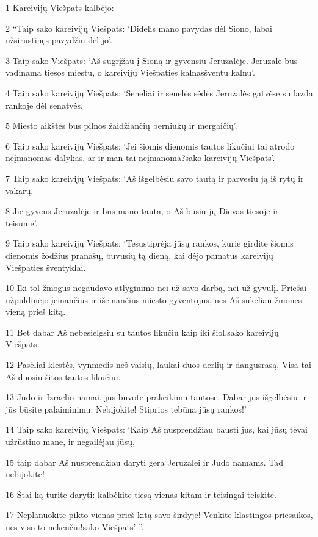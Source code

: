 \par 1 Kareivijų Viešpats kalbėjo: 
\par 2 “Taip sako kareivijų Viešpats: ‘Didelis mano pavydas dėl Siono, labai užsirūstinęs pavydžiu dėl jo’. 
\par 3 Taip sako Viešpats: ‘Aš sugrįžau į Sioną ir gyvensiu Jeruzalėje. Jeruzalė bus vadinama tiesos miestu, o kareivijų Viešpaties kalnas­šventu kalnu’. 
\par 4 Taip sako kareivijų Viešpats: ‘Seneliai ir senelės sėdės Jeruzalės gatvėse su lazda rankoje dėl senatvės. 
\par 5 Miesto aikštės bus pilnos žaidžiančių berniukų ir mergaičių’. 
\par 6 Taip sako kareivijų Viešpats: ‘Jei šiomis dienomis tautos likučiui tai atrodo neįmanomas dalykas, ar ir man tai neįmanoma?­sako kareivijų Viešpats’. 
\par 7 Taip sako kareivijų Viešpats: ‘Aš išgelbėsiu savo tautą ir parvesiu ją iš rytų ir vakarų. 
\par 8 Jie gyvens Jeruzalėje ir bus mano tauta, o Aš būsiu jų Dievas tiesoje ir teisume’. 
\par 9 Taip sako kareivijų Viešpats: ‘Tesustiprėja jūsų rankos, kurie girdite šiomis dienomis žodžius pranašų, buvusių tą dieną, kai dėjo pamatus kareivijų Viešpaties šventyklai. 
\par 10 Iki tol žmogus negaudavo atlyginimo nei už savo darbą, nei už gyvulį. Priešai užpuldinėjo įeinančius ir išeinančius miesto gyventojus, nes Aš sukėliau žmones vieną prieš kitą. 
\par 11 Bet dabar Aš nebesielgsiu su tautos likučiu kaip iki šiol,­sako kareivijų Viešpats.­ 
\par 12 Pasėliai klestės, vynmedis neš vaisių, laukai duos derlių ir dangus­rasą. Visa tai Aš duosiu šitos tautos likučiui. 
\par 13 Judo ir Izraelio namai, jūs buvote prakeikimu tautose. Dabar jus išgelbėsiu ir jūs būsite palaiminimu. Nebijokite! Stiprios tebūna jūsų rankos!’ 
\par 14 Taip sako kareivijų Viešpats: ‘Kaip Aš nusprendžiau bausti jus, kai jūsų tėvai užrūstino mane, ir negailėjau jūsų, 
\par 15 taip dabar Aš nusprendžiau daryti gera Jeruzalei ir Judo namams. Tad nebijokite! 
\par 16 Štai ką turite daryti: kalbėkite tiesą vienas kitam ir teisingai teiskite. 
\par 17 Neplanuokite pikto vienas prieš kitą savo širdyje! Venkite klastingos priesaikos, nes viso to nekenčiu!­sako Viešpats’ ”. 
